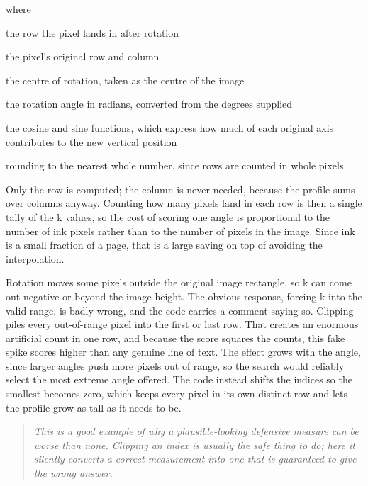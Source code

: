 \noindent where
\begin{description}[leftmargin=2.4em,style=nextline,font=\normalfont\ttfamily]\setlength\itemsep{1pt}
  \item[{$k$}] \normalfont the row the pixel lands in after rotation
  \item[{$y,\,x$}] \normalfont the pixel's original row and column
  \item[{$c_y,\,c_x$}] \normalfont the centre of rotation, taken as the centre of the image
  \item[{$\theta$}] \normalfont the rotation angle in radians, converted from the degrees supplied
  \item[{$\cos,\,\sin$}] \normalfont the cosine and sine functions, which express how much of each original axis contributes to the new vertical position
  \item[{$\mathrm{round}$}] \normalfont rounding to the nearest whole number, since rows are counted in whole pixels
\end{description}
Only the row is computed; the column is never needed, because the profile sums over columns anyway. Counting how many pixels land in each row is then a single tally of the k values, so the cost of scoring one angle is proportional to the number of ink pixels rather than to the number of pixels in the image. Since ink is a small fraction of a page, that is a large saving on top of avoiding the interpolation.


Rotation moves some pixels outside the original image rectangle, so k can come out negative or beyond the image height. The obvious response, forcing k into the valid range, is badly wrong, and the code carries a comment saying so. Clipping piles every out-of-range pixel into the first or last row. That creates an enormous artificial count in one row, and because the score squares the counts, this fake spike scores higher than any genuine line of text. The effect grows with the angle, since larger angles push more pixels out of range, so the search would reliably select the most extreme angle offered. The code instead shifts the indices so the smallest becomes zero, which keeps every pixel in its own distinct row and lets the profile grow as tall as it needs to be.


\begin{quote}\small\itshape This is a good example of why a plausible-looking defensive measure can be worse than none. Clipping an index is usually the safe thing to do; here it silently converts a correct measurement into one that is guaranteed to give the wrong answer.\end{quote}


